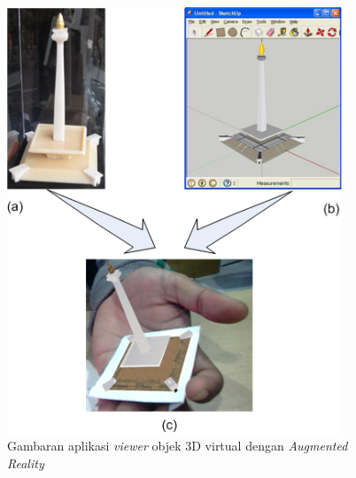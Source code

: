 \begin{figure}[h]
\begin{center}
\includegraphics[width=10cm]{./images/real_virtual_ar}
\caption{\label{fig:real_virtual_ar} Gambaran aplikasi \textit{viewer} objek 3D virtual dengan \textit{Augmented Reality}}
\end{center}
\end{figure}

